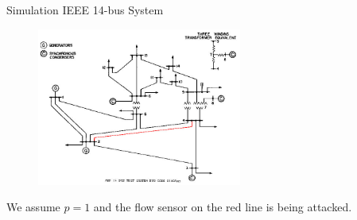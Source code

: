 \documentclass[10pt]{beamer}
\DeclareMathOperator{\argmin}{arg\;min}
\begin{document}

\begin{frame}{Simulation IEEE 14-bus System}
  \begin{figure}[ht]
    \centering
    \includegraphics[width=0.60\textwidth]{ieee14.jpg}
  \end{figure}
  We assume $p=1$ and the flow sensor on the red line is being attacked.
\end{frame}
\end{document}
